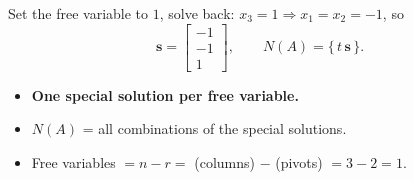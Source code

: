 \documentclass[aspectratio=169, 11pt]{beamer}
\newcommand{\svec}{\mathbf{s}}
\begin{document}
\begin{frame}[t, plain]
  Set the free variable to $1$, solve back: $x_3=1 \Rightarrow x_1=x_2=-1$, so
  \[ \svec=\begin{bmatrix} -1\\-1\\1 \end{bmatrix}, \qquad N(A)=\{\,t\,\svec\,\}. \]
  \begin{itemize}
    \setlength{\itemsep}{5pt}
    \item \textbf{One special solution per free variable.}
    \item $N(A)$ = all combinations of the special solutions.
    \item Free variables $=n-r=$ (columns) $-$ (pivots) $=3-2=1$.
  \end{itemize}
\end{frame}
\end{document}
